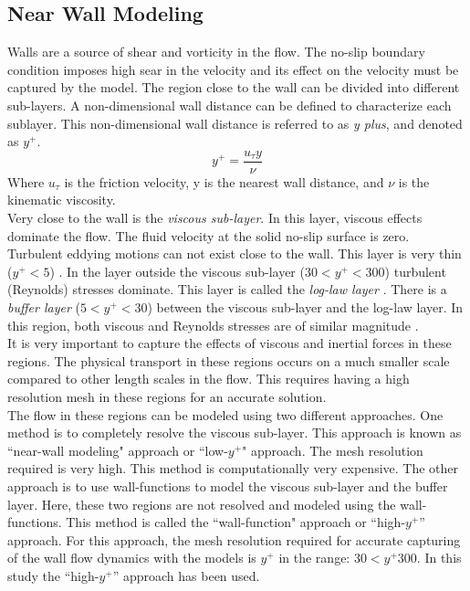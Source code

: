 \subsection{Near Wall Modeling}\label{PrismLayer}
Walls are a source of shear and vorticity in the flow. The no-slip boundary condition imposes high sear in the velocity and its effect on the velocity must be captured by the model. The region close to the wall can be divided into different sub-layers. A non-dimensional wall distance can be defined to characterize each sublayer. This non-dimensional wall distance is referred to as \textit{y plus}, and denoted as $y^+$.
\begin{equation}
y^+ = \frac{u_\tau y}{\nu} \label{y plus}
\end{equation}
Where $u_\tau$ is the friction velocity, y is the nearest wall distance, and $\nu$ is the kinematic viscosity.\\
 Very close to the wall is the \textit{viscous sub-layer}. In this layer, viscous effects dominate the flow. The fluid velocity at the solid no-slip surface is zero. Turbulent eddying motions can not exist close to the wall. This layer is  very thin ($y^+ < 5$) \cite{Reference8}. In the layer outside the viscous sub-layer ($30 < y^+ < 300$) turbulent (Reynolds) stresses dominate. This layer is called the \textit{log-law layer} \cite{Reference8}. There is a \textit{buffer layer} ($5 < y^+ < 30$) between the viscous sub-layer and the log-law layer. In this region, both viscous and Reynolds stresses are of similar magnitude \cite{Reference8}.\\
It is very important to capture the effects of viscous and inertial forces in these regions. The physical transport in these regions occurs on a much smaller scale compared to other length scales in the flow. This requires having a high resolution mesh in these regions for an accurate solution.\\
The flow in these regions can be modeled using two different approaches. One method is to completely resolve the viscous sub-layer. This approach is known as ``near-wall modeling" approach or ``low-$y^+$" approach. The mesh resolution required is very high. This method is computationally very expensive. The other approach is to use wall-functions to model the viscous sub-layer and the buffer layer. Here, these two regions are not resolved and modeled using the wall-functions. This method is called the ``wall-function" approach or ``high-$y^+$'' approach. For this approach, the mesh resolution required for accurate capturing of the wall flow dynamics with the models is $y^+$ in the range: $30< y^+ 300$. In this study the ``high-$y^+$'' approach has been used.\\

